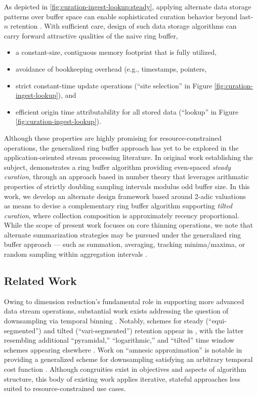 As depicted in \ref{fig:curation-ingest-lookup:steady}, applying alternate data storage patterns over buffer space can enable sophisticated curation behavior beyond last-$n$ retention \citep{gunther2014compressing}.
With sufficient care, design of such data storage algorithms can carry forward attractive qualities of the naive ring buffer,
\begin{itemize}
\item a constant-size, contiguous memory footprint that is fully utilized,
\item avoidance of bookkeeping overhead (e.g., timestamps, pointers, \item strict constant-time update operations (``site selection''  in Figure \ref{fig:curation-ingest-lookup}), and
\item efficient origin time attributability for all stored data (``lookup''  in Figure \ref{fig:curation-ingest-lookup}).
\end{itemize}

Although these properties are highly promising for resource-constrained operations, the generalized ring buffer approach has yet to be explored in the application-oriented stream processing literature.
In original work establishing the subject, \citet{gunther2014compressing} demonstrates a ring buffer algorithm providing even-spaced \textit{steady curation}, through an approach based in number theory that leverages arithmatic properties of strictly doubling sampling intervals modulus odd buffer size.
In this work, we develop an alternate design framework based around 2-adic valuations as means to devise a complementary ring buffer algorithm supporting \textit{tilted curation}, where collection composition is approximately recency proportional.
While the scope of present work focuses on core thinning operations, we note that alternate summarization strategies may be pursued under the generalized ring buffer approach --- such as summation, averaging, tracking minima/maxima, or random sampling within aggregation intervals \citep{gunther2014compressing}.

\subsection{Related Work}

Owing to dimension reduction's fundamental role in supporting more advanced data stream operations, substantial work exists addressing the question of downsampling via temporal binning \citep{sibai2016sampling,gama2007data}.
Notably, schemes for steady (``equi-segmented'') and tilted (``vari-segmented'') retention appear in \citep{zhao2005generalized}, with the latter resembling additional ``pyramidal,'' ``logarithmic,'' and ``tilted'' time window schemes appearing elsewhere \citep{aggarwal2003framework,han2005stream,giannella2003mining,phithakkitnukoon2010recent}.
Work on ``amnesic approximation'' is notable in providing a generalized scheme for downsampling satisfying an arbitrary temporal cost function \citep{palpanas2004online}.
Although congruities exist in objectives and aspects of algorithm structure, this body of existing work applies iterative, stateful approaches less suited to resource-constrained use cases.

